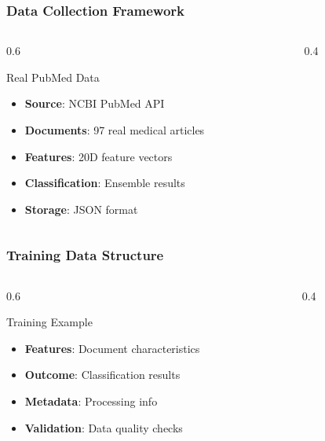 \documentclass{beamer}
\begin{document}
\begin{frame}
\frametitle{Data Collection Framework}
\begin{columns}
\begin{column}{0.6\textwidth}
\begin{block}{Real PubMed Data}
\begin{itemize}
\item \textbf{Source}: NCBI PubMed API
\item \textbf{Documents}: 97 real medical articles
\item \textbf{Features}: 20D feature vectors
\item \textbf{Classification}: Ensemble results
\item \textbf{Storage}: JSON format
\end{itemize}
\end{block}
\end{column}
\begin{column}{0.4\textwidth}
\begin{center}
\end{center}
\end{column}
\end{columns}
\end{frame}

\begin{frame}
\frametitle{Training Data Structure}
\begin{columns}
\begin{column}{0.6\textwidth}
\begin{block}{Training Example}
\begin{itemize}
\item \textbf{Features}: Document characteristics
\item \textbf{Outcome}: Classification results
\item \textbf{Metadata}: Processing info
\item \textbf{Validation}: Data quality checks
\end{itemize}
\end{block}
\end{column}
\begin{column}{0.4\textwidth}
\begin{center}
\end{center}
\end{column}
\end{columns}
\end{frame}
\end{document}

